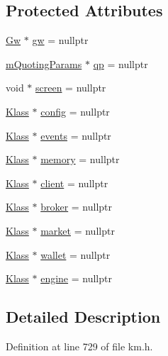 \subsection*{Protected Attributes}
\begin{DoxyCompactItemize}
\item 
\hyperlink{class_k_1_1_gw}{Gw} $\ast$ \hyperlink{class_k_1_1_klass_a1cc87ecfd597953b3774a8e1fa4c25ec}{gw} = nullptr
\item 
\hyperlink{struct_k_1_1m_quoting_params}{m\+Quoting\+Params} $\ast$ \hyperlink{class_k_1_1_klass_a4554a7ffab1a73a5d43f13b9ac54ffb1}{qp} = nullptr
\item 
void $\ast$ \hyperlink{class_k_1_1_klass_a5819639653d62dde47c40c9d0c06f7ac}{screen} = nullptr
\item 
\hyperlink{class_k_1_1_klass}{Klass} $\ast$ \hyperlink{class_k_1_1_klass_a50e6a746d37cecad79ebeabcb5677722}{config} = nullptr
\item 
\hyperlink{class_k_1_1_klass}{Klass} $\ast$ \hyperlink{class_k_1_1_klass_aef02c650240e6291d8a616cda222d890}{events} = nullptr
\item 
\hyperlink{class_k_1_1_klass}{Klass} $\ast$ \hyperlink{class_k_1_1_klass_afe23c0cbde1ef3bc79fdd6e56f9c120a}{memory} = nullptr
\item 
\hyperlink{class_k_1_1_klass}{Klass} $\ast$ \hyperlink{class_k_1_1_klass_ad64d722352731ddedb64ba82179e0eaa}{client} = nullptr
\item 
\hyperlink{class_k_1_1_klass}{Klass} $\ast$ \hyperlink{class_k_1_1_klass_a48fc03cfcc056aaefb1811e35942008f}{broker} = nullptr
\item 
\hyperlink{class_k_1_1_klass}{Klass} $\ast$ \hyperlink{class_k_1_1_klass_a98dbde943a8c48f1f266b879e5409777}{market} = nullptr
\item 
\hyperlink{class_k_1_1_klass}{Klass} $\ast$ \hyperlink{class_k_1_1_klass_a5943d9c958085108c746fdc756c7aad3}{wallet} = nullptr
\item 
\hyperlink{class_k_1_1_klass}{Klass} $\ast$ \hyperlink{class_k_1_1_klass_ad2746d88e168f466f52cdf9e07f67ab1}{engine} = nullptr
\end{DoxyCompactItemize}


\subsection{Detailed Description}


Definition at line 729 of file km.\+h.



